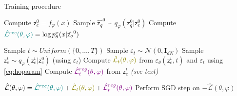 \documentclass[nohyperref]{article}
\theoremstyle{plain}
\theoremstyle{definition}
\theoremstyle{remark}
\newcommand{\latentcont}{\mathsf{z}_e}
\newcommand{\latentdis}{\mathsf{z}_q}
\newcommand{\rme}{\mathrm{e}}
\begin{document}


\begin{algorithm}[tb]
   \caption{Training procedure}
   \label{alg:train}
\begin{algorithmic}
   \REPEAT
   

   \STATE Compute $\latentcont^0= f_\varphi(x)$ 
   \STATE Sample $\hat{\latentdis}^0 \sim q_\varphi(\latentdis^0|\latentcont^0)$
   \STATE Compute $\textcolor{teal}{\hat{\mathcal{L}}^{rec}(\theta,\varphi)} = \log p^x_{\theta}(x|\hat{\latentdis}^0)$ 

   \STATE Sample $t \sim Uniform(\{0,\ldots, T\})$ 
   \STATE Sample $\varepsilon_t \sim \mathcal{N}(0,\mathbf{I}_{dN})$
   \STATE Sample $\latentcont^{t} \sim q_\varphi(\latentcont^t|\latentcont^0)$ (using $\varepsilon_t$)
   \STATE Compute $\textcolor{olive}{\hat{\mathcal{L}}_t(\theta,\varphi)}$ from $\varepsilon_\theta(\latentcont^{t},t)$ and $\varepsilon_t$ using \eqref{eq:hoparam}
   \STATE Compute $\textcolor{violet}{\hat{\mathcal{L}}^{reg}_t(\theta,\varphi)}$ from $\latentcont^{t}$ \textit{(see text)}

   \STATE $\hat{\mathcal{L}}(\theta,\varphi) = \textcolor{teal}{\hat{\mathcal{L}}^{rec}(\theta,\varphi)} + \textcolor{olive}{\hat{\mathcal{L}}_t(\theta,\varphi)} + \textcolor{violet}{\hat{\mathcal{L}}^{reg}_t(\theta,\varphi)}$
   \STATE Perform SGD step on $-\hat{\mathcal{L}}(\theta,\varphi)$
\end{algorithmic}
\end{algorithm}
\end{document}
